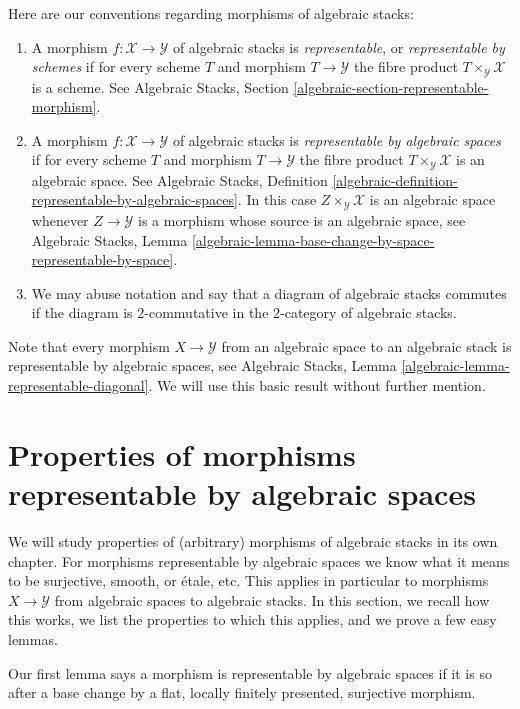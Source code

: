 Here are our conventions regarding morphisms of algebraic stacks:
\begin{enumerate}
\item A morphism $f : \mathcal{X} \to \mathcal{Y}$
of algebraic stacks is {\it representable}, or
{\it representable by schemes} if for every scheme
$T$ and morphism $T \to \mathcal{Y}$ the fibre product
$T \times_\mathcal{Y} \mathcal{X}$ is a scheme.
See
Algebraic Stacks, Section \ref{algebraic-section-representable-morphism}.
\item A morphism $f : \mathcal{X} \to \mathcal{Y}$
of algebraic stacks is {\it representable by algebraic spaces}
if for every scheme $T$ and morphism $T \to \mathcal{Y}$ the fibre product
$T \times_\mathcal{Y} \mathcal{X}$ is an algebraic space.
See Algebraic Stacks,
Definition \ref{algebraic-definition-representable-by-algebraic-spaces}.
In this case $Z \times_\mathcal{Y} \mathcal{X}$ is an algebraic
space whenever $Z \to \mathcal{Y}$ is a morphism whose source is
an algebraic space, see
Algebraic Stacks,
Lemma \ref{algebraic-lemma-base-change-by-space-representable-by-space}.
\item We may abuse notation and say that a diagram of algebraic stacks
commutes if the diagram is $2$-commutative in the $2$-category of
algebraic stacks.
\end{enumerate}
Note that every morphism $X \to \mathcal{Y}$ from an algebraic space
to an algebraic stack is representable by algebraic spaces, see
Algebraic Stacks, Lemma \ref{algebraic-lemma-representable-diagonal}.
We will use this basic result without further mention.




\section{Properties of morphisms representable by algebraic spaces}
\label{section-properties-morphisms}

\noindent
We will study properties of (arbitrary) morphisms of algebraic stacks in its
own chapter. For morphisms representable by algebraic spaces we know what
it means to be surjective, smooth, or \'etale, etc. This applies in particular
to morphisms $X \to \mathcal{Y}$ from algebraic spaces to algebraic stacks.
In this section, we recall how this works, we list the properties to which
this applies, and we prove a few easy lemmas.

\medskip\noindent
Our first lemma says a morphism is representable by algebraic spaces
if it is so after a base change by a flat,
locally finitely presented, surjective morphism.

